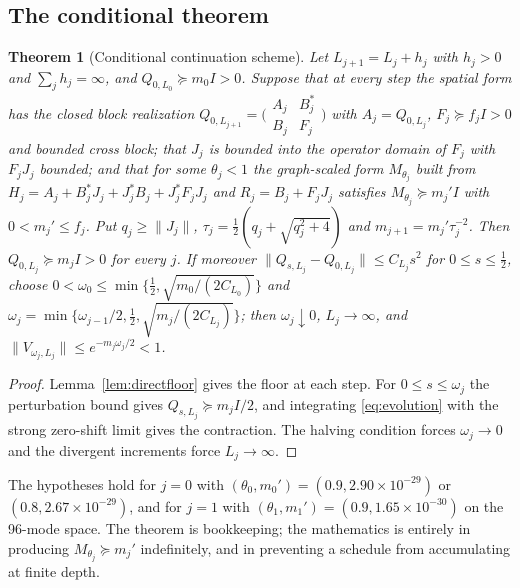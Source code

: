 \documentclass[11pt]{article}
\numberwithin{equation}{section}
\newtheorem{theorem}{Theorem}[section]
\theoremstyle{definition}
\theoremstyle{remark}
\newcommand{\norm}[1]{\lVert#1\rVert}
\newcommand{\FloorRelNine}{2.90\times10^{-29}}           %
\newcommand{\FloorRelEight}{2.67\times10^{-29}}         %
\newcommand{\FloorRelTwo}{1.65\times10^{-30}}       %
\begin{document}
\subsection{The conditional theorem}
\begin{theorem}[Conditional continuation scheme]\label{thm:conditional}
Let $L_{j+1}=L_j+h_j$ with $h_j>0$ and $\sum_jh_j=\infty$, and $Q_{0,L_0}\succeq m_0I>0$. Suppose that at every step the spatial form has the closed block realization $Q_{0,L_{j+1}}=\bigl(\begin{smallmatrix}A_j&B_j^*\\B_j&F_j\end{smallmatrix}\bigr)$ with $A_j=Q_{0,L_j}$, $F_j\succeq f_jI>0$ and bounded cross block; that $J_j$ is bounded into the operator domain of $F_j$ with $F_jJ_j$ bounded; and that for some $\theta_j<1$ the graph-scaled form $M_{\theta_j}$ built from $H_j=A_j+B_j^*J_j+J_j^*B_j+J_j^*F_jJ_j$ and $R_j=B_j+F_jJ_j$ satisfies $M_{\theta_j}\succeq m_j'I$ with $0<m_j'\le f_j$. Put $q_j\ge\norm{J_j}$, $\tau_j=\tfrac12(q_j+\sqrt{q_j^2+4})$ and $m_{j+1}=m_j'\tau_j^{-2}$. Then $Q_{0,L_j}\succeq m_jI>0$ for every $j$. If moreover $\norm{Q_{s,L_j}-Q_{0,L_j}}\le C_{L_j}s^2$ for $0\le s\le\tfrac12$, choose $0<\omega_0\le\min\{\tfrac12,\sqrt{m_0/(2C_{L_0})}\}$ and $\omega_j=\min\{\omega_{j-1}/2,\tfrac12,\sqrt{m_j/(2C_{L_j})}\}$; then $\omega_j\downarrow0$, $L_j\to\infty$, and $\norm{V_{\omega_j,L_j}}\le e^{-m_j\omega_j/2}<1$.
\end{theorem}
\begin{proof}
Lemma~\ref{lem:directfloor} gives the floor at each step. For $0\le s\le\omega_j$ the perturbation bound gives $Q_{s,L_j}\succeq m_jI/2$, and integrating \eqref{eq:evolution} with the strong zero-shift limit gives the contraction. The halving condition forces $\omega_j\to0$ and the divergent increments force $L_j\to\infty$.
\end{proof}

The hypotheses hold for $j=0$ with $(\theta_0,m_0')=(0.9,\FloorRelNine)$ or $(0.8,\FloorRelEight)$, and for $j=1$ with $(\theta_1,m_1')=(0.9,\FloorRelTwo)$ on the 96-mode space. The theorem is bookkeeping; the mathematics is entirely in producing $M_{\theta_j}\succeq m_j'$ indefinitely, and in preventing a schedule from accumulating at finite depth.
\end{document}
